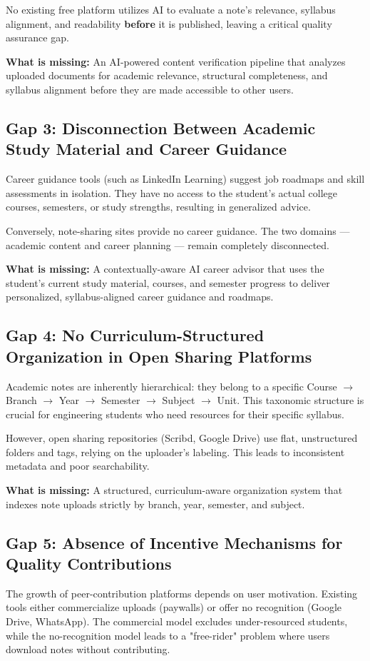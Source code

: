 \documentclass[12,Times new Roman,a4paper]{report}
\begin{document}
No existing free platform utilizes AI to evaluate a note's relevance, syllabus alignment, and readability \textbf{before} it is published, leaving a critical quality assurance gap.

\textbf{What is missing:} An AI-powered content verification pipeline that analyzes uploaded documents for academic relevance, structural completeness, and syllabus alignment before they are made accessible to other users.

\subsection{Gap 3: Disconnection Between Academic Study Material and Career Guidance}
Career guidance tools (such as LinkedIn Learning) suggest job roadmaps and skill assessments in isolation. They have no access to the student's actual college courses, semesters, or study strengths, resulting in generalized advice.

Conversely, note-sharing sites provide no career guidance. The two domains --- academic content and career planning --- remain completely disconnected.

\textbf{What is missing:} A contextually-aware AI career advisor that uses the student's current study material, courses, and semester progress to deliver personalized, syllabus-aligned career guidance and roadmaps.

\subsection{Gap 4: No Curriculum-Structured Organization in Open Sharing Platforms}
Academic notes are inherently hierarchical: they belong to a specific Course $\rightarrow$ Branch $\rightarrow$ Year $\rightarrow$ Semester $\rightarrow$ Subject $\rightarrow$ Unit. This taxonomic structure is crucial for engineering students who need resources for their specific syllabus.

However, open sharing repositories (Scribd, Google Drive) use flat, unstructured folders and tags, relying on the uploader's labeling. This leads to inconsistent metadata and poor searchability.

\textbf{What is missing:} A structured, curriculum-aware organization system that indexes note uploads strictly by branch, year, semester, and subject.

\subsection{Gap 5: Absence of Incentive Mechanisms for Quality Contributions}
The growth of peer-contribution platforms depends on user motivation. Existing tools either commercialize uploads (paywalls) or offer no recognition (Google Drive, WhatsApp). The commercial model excludes under-resourced students, while the no-recognition model leads to a "free-rider" problem where users download notes without contributing.
\end{document}
